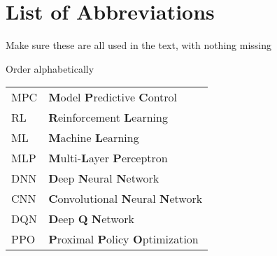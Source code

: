 \chapter*{List of Abbreviations}

\begin{todo}
  Make sure these are all used in the text, with nothing missing
\end{todo}

\begin{todo}
  Order alphabetically
\end{todo}

\begin{table}[h!]
  \centering
  \begin{tabular}{ll}
    MPC & \textbf{M}odel \textbf{P}redictive \textbf{C}ontrol \\
    RL & \textbf{R}einforcement \textbf{L}earning \\
    ML & \textbf{M}achine \textbf{L}earning \\
    MLP & \textbf{M}ulti-\textbf{L}ayer \textbf{P}erceptron \\
    DNN & \textbf{D}eep \textbf{N}eural \textbf{N}etwork \\
    CNN & \textbf{C}onvolutional \textbf{N}eural \textbf{N}etwork \\
    DQN & \textbf{D}eep \textbf{Q} \textbf{N}etwork \\
    PPO & \textbf{P}roximal \textbf{P}olicy \textbf{O}ptimization \\
  \end{tabular}
\end{table}
